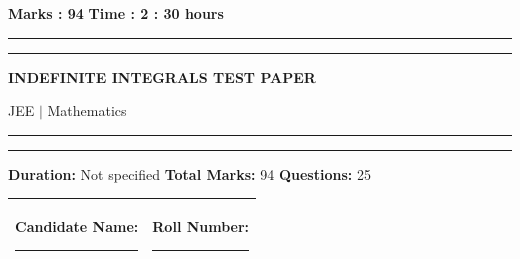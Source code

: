 \documentclass[11pt,a4paper]{article}
\begin{document}
\vspace{2mm}
\noindent \textbf{Marks : 94} \hfill \textbf{Time : 2 : 30 hours}
\noindent\rule{\linewidth}{1.1pt}\vspace{-1mm}\noindent\rule{\linewidth}{0.5pt}
{\centering \Large \textbf{INDEFINITE INTEGRALS TEST PAPER}\par}
{\centering JEE $|$ Mathematics\par}
\noindent\rule{\linewidth}{1.1pt}\vspace{-1mm}\noindent\rule{\linewidth}{0.5pt}
\vspace{1mm}
\noindent \textbf{Duration:} Not specified \quad \textbf{Total Marks:} 94 \quad \textbf{Questions:} 25\par
\vspace{2mm}

\begin{tabularx}{\linewidth}{|X|X|}\hline
Candidate Name: \rule{6cm}{0.4pt} & Roll Number: \rule{3.5cm}{0.4pt} \\\hline
\end{tabularx}
\end{document}
